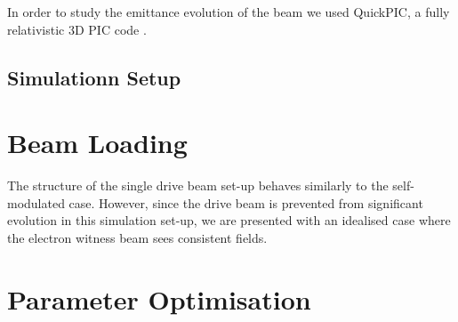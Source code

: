 \documentclass[aps,prstab,reprint,amsmath,amssymb,groupedaddress]{revtex4-1}
\begin{document}
In order to study the emittance evolution of the beam we used QuickPIC, a fully relativistic 3D PIC code
\cite{huang:2006, an:2013}.

\subsection[\label{S:M:Setup}]{Simulationn Setup}



\section[\label{S:BL}]{Beam Loading}


The structure of the single drive beam set-up behaves similarly to the self-modulated case. However, since the drive
beam is prevented from significant evolution in this simulation set-up, we are presented with an idealised case where
the electron witness beam sees consistent fields.






\section[\label{S:PO}]{Parameter Optimisation}
\end{document}
